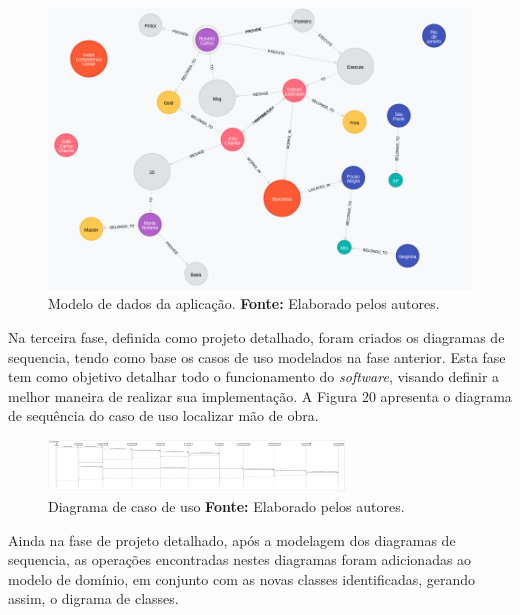 \begin{figure}[h!]
	\centerline{\includegraphics[scale=0.5]{./imagens/structure-all-nodes.png}}
	\caption[Modelo de dados da aplicação]
	{Modelo de dados da aplicação. \textbf{Fonte:} Elaborado pelos autores.}
	\label{fig:exemplo1}
\end{figure} 


\par Na terceira fase, definida como projeto detalhado, foram criados os diagramas de sequencia, tendo como base os casos de uso modelados na fase anterior. Esta fase tem como objetivo detalhar todo o funcionamento do \textit{software}, visando definir a melhor maneira de realizar sua implementação. A Figura 20 apresenta o diagrama de sequência do caso de uso localizar mão de obra.

\newpage
\begin{figure}[h!]
	\centerline{\includegraphics[angle=90,height=0.7\textheight,width=0.7\textwidth]{./imagens/sequence-localizar-mao-de-obra.png}}
	\caption[Diagrama de caso de uso]
	{Diagrama de caso de uso \textbf{Fonte:} Elaborado pelos autores.}
	\label{fig:exemplo1}
\end{figure}

\par Ainda na fase de projeto detalhado, após a modelagem dos diagramas de sequencia, as operações encontradas nestes diagramas foram adicionadas ao modelo de domínio, em conjunto com as novas classes identificadas, gerando assim, o digrama de classes.


